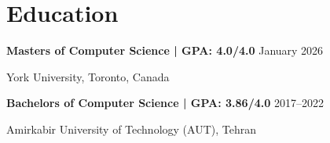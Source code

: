 \renewcommand{\subsection}[3]{
    \noindent\textbf{#1}  \emph{#2} \hfill #3 \break
}
\section{Education}
\subsection{Masters of Computer Science | GPA: 4.0/4.0}{}{January 2026}
York University, Toronto, Canada

\subsection{Bachelors of Computer Science | GPA: 3.86/4.0}{}{2017--2022}
Amirkabir University of Technology (AUT), Tehran



